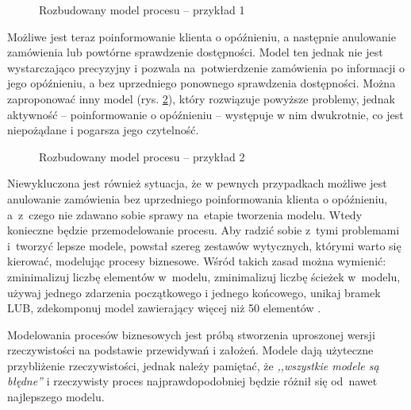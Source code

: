 \begin{figure}[h]
	\caption{\label{fig:complicated_business_process_1}Rozbudowany model procesu -- przykład 1}
\end{figure}

Możliwe jest teraz poinformowanie klienta o opóźnieniu, a następnie anulowanie zamówienia lub powtórne sprawdzenie dostępności. Model ten jednak nie jest wystarczająco precyzyjny i pozwala na~potwierdzenie zamówienia po informacji o jego opóźnieniu, a bez uprzedniego ponownego sprawdzenia dostępności. Można zaproponować inny model (rys. \ref{fig:complicated_business_process_2}), który rozwiązuje powyższe problemy, jednak aktywność -- poinformowanie o opóźnieniu -- występuje w nim dwukrotnie, co jest niepożądane i pogarsza jego czytelność.

\begin{figure}[h]
	\caption{\label{fig:complicated_business_process_2}Rozbudowany model procesu -- przykład 2}
\end{figure}

Niewykluczona jest również sytuacja, że w pewnych przypadkach możliwe jest anulowanie zamówienia bez uprzedniego poinformowania klienta o opóźnieniu, a~z~czego nie zdawano sobie sprawy na~etapie tworzenia modelu. Wtedy konieczne będzie przemodelowanie procesu. Aby radzić sobie z~tymi problemami i~tworzyć lepsze modele, powstał szereg zestawów wytycznych, którymi warto się kierować, modelując procesy biznesowe. Wśród takich zasad można wymienić: zminimalizuj liczbę elementów w~modelu, zminimalizuj liczbę ścieżek w~modelu, używaj jednego zdarzenia początkowego i jednego końcowego, unikaj bramek LUB, zdekomponuj model zawierający więcej niż 50 elementów \cite{7PMG}.

Modelowania procesów biznesowych jest próbą stworzenia uproszonej wersji rzeczywistości na podstawie przewidywań i założeń. Modele dają użyteczne przybliżenie rzeczywistości, jednak należy pamiętać, że \textit{,,wszystkie modele są błędne''} i rzeczywisty proces najprawdopodobniej będzie różnił się od~nawet najlepszego modelu. 


